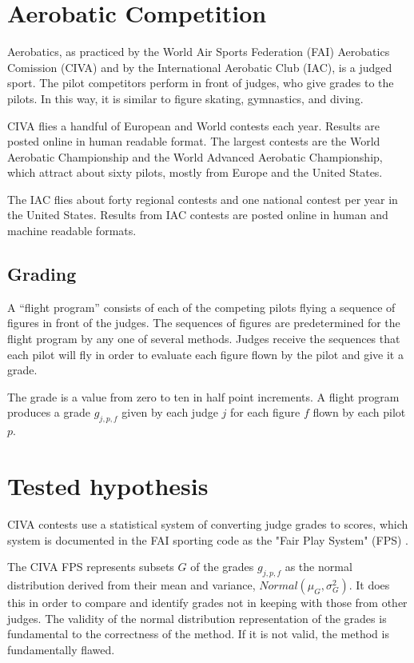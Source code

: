 \section{Aerobatic Competition}

Aerobatics, as practiced by the World Air Sports Federation (FAI)
Aerobatics Comission (CIVA) and by the International Aerobatic Club (IAC),
is a judged sport. The pilot competitors perform in front of judges, who
give grades to the pilots. In this way, it is similar to figure skating,
gymnastics, and diving.

CIVA flies a handful of European and World contests each year.
Results are posted online \cite{civa-results} in human readable format.
The largest contests are the World Aerobatic Championship \cite{wac}
and the World Advanced Aerobatic Championship, which attract about sixty
pilots, mostly from Europe and the United States.

The IAC flies about forty regional contests and one national contest
per year in the United States.
Results from IAC contests are posted online \cite{iaccdb}
in human and machine readable formats.

\subsection{Grading}

A ``flight program'' consists of each of the competing pilots flying a sequence
of figures in front of the judges. The sequences of figures are predetermined
for the flight program by any one of several methods.
Judges receive the sequences that each pilot will fly in order to evaluate
each figure flown by the pilot and give it a grade.

The grade is a value from zero to ten in half point increments.
A flight program produces a grade $g_{j,p,f}$
given by each judge $j$ for each figure $f$ flown by each pilot $p$.

\section{Tested hypothesis}

CIVA contests use a statistical system of converting judge grades to scores,
which system is documented in the FAI sporting code as the "Fair Play System"
(FPS) \cite{fps}.

The CIVA FPS represents subsets $G$ of the grades $g_{j,p,f}$
as the normal distribution derived from their mean and variance,
$Normal(\mu_G, \sigma^2_G)$.
It does this in order to compare and
identify grades not in keeping with those from other judges.
The validity of the normal distribution
representation of the grades is fundamental to the correctness of the method.
If it is not valid, the method is fundamentally flawed.

